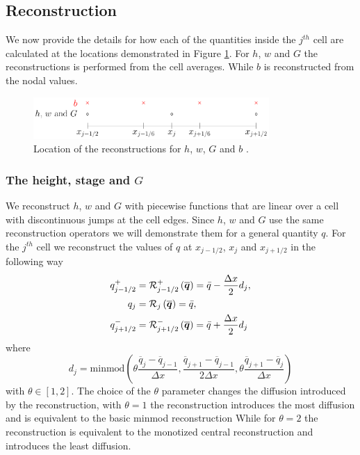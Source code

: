 \setcounter{subsection}{0}
\renewcommand{\thesubsection}{(\roman{subsection})} 
\subsection{Reconstruction}
We now provide the details for how each of the quantities inside the $j^{th}$ cell are calculated at the locations demonstrated in Figure \ref{fig:ReconLocs}. For $h$, $w$ and $G$ the reconstructions is performed from the cell averages. While $b$ is reconstructed from the nodal values.

\begin{figure}
	\centering
	\includegraphics[width=0.8\textwidth]{./chp3/figures/FEVMRecon.pdf}
	\caption{Location of the reconstructions for $h$, $w$, $G$ and $b$ .}
	\label{fig:ReconLocs}
\end{figure}

\subsubsection{The height, stage and $G$}
We reconstruct $h$, $w$ and $G$ with piecewise functions that are linear over a cell with discontinuous jumps at the cell edges. Since $h$, $w$ and $G$ use the same reconstruction operators we will demonstrate them for a general quantity $q$. For the $j^{th}$ cell we reconstruct the values of $q$ at $x_{j-1/2} $, $x_{j} $ and $x_{j+1/2}$ in the following way
\begin{subequations}
	\begin{align}
	q^+_{j-1/2} & = \mathcal{R}^+_{j-1/2} \left(\overline{\boldsymbol{q}}\right) = \bar{q} - \dfrac{\Delta x}{2} d_j, \\
	q_{j} &= \mathcal{R}_{j} \left(\overline{\boldsymbol{q}}\right) =\bar{q} ,\\
	q^-_{j+1/2} &= \mathcal{R}^-_{j+1/2} \left(\overline{\boldsymbol{q}}\right) = \bar{q} + \dfrac{\Delta x}{2} d_j
	\end{align}
	\label{eqn:ReconforhwG}
\end{subequations}
where 
\begin{equation*}
d_j = \text{minmod}\left(\theta \dfrac{\overline{q}_j -\overline{q}_{j-1} }{\Delta x}, \dfrac{\overline{q}_{j+1} -\overline{q}_{j-1} }{2\Delta x}, \theta\dfrac{\overline{q}_{j+1} -\overline{q}_{j} }{\Delta x}\right)
\label{eqn:slopehGrecon}
\end{equation*}
with $\theta \in \left[1,2\right]$. The choice of the $\theta$ parameter changes the diffusion introduced by the reconstruction, with $\theta =1$ the reconstruction introduces the most diffusion and is equivalent to the basic minmod reconstruction \cite{Roe-1986-337} While for $\theta = 2$ the reconstruction is equivalent to the monotized central reconstruction \citealp{VanLeer-1977-276} and introduces the least diffusion.

